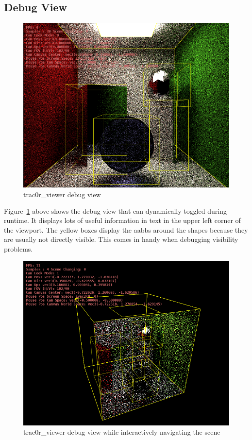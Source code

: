 \documentclass[
  twoside,
  11pt, a4paper,
  footinclude=true,
  headinclude=true,
  cleardoublepage=empty
]{scrreprt}
\begin{document}
\subsection{Debug View}
\begin{figure}[H]
    \includegraphics[scale=0.5]{trac0r-debug1.png}
    \centering
    \caption{trac0r\_viewer debug view}
    \label{fig:trac0r_debug1}
\end{figure}

Figure~\ref{fig:trac0r_debug1} above shows the debug view that can dynamically toggled during
runtime. It displays lots of useful information in text in the upper left corner of the
viewport. The yellow boxes display the \acp{aabb} around the shapes because they are usually not
directly visible. This comes in handy when debugging visibility problems.

\begin{figure}[H]
    \includegraphics[scale=0.5]{trac0r-debug2.png}
    \centering
    \caption{trac0r\_viewer debug view while interactively navigating the scene}
    \label{fig:trac0r_debug2}
\end{figure}
\end{document}
